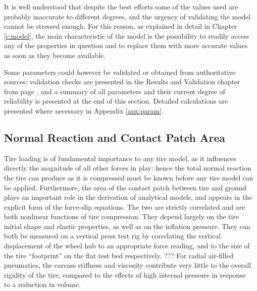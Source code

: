 \documentclass[12pt,a4paper]{report}
\newcommand{\virgolette}[1]{
\textquotedblleft #1\textquotedblright
}
\begin{document}
It is well understood that despite the best efforts some of the values used are probably inaccurate to different degrees, and the urgency of validating the model cannot be stressed enough.
For this reason, as explained in detail in Chapter \ref{c:model}, the main characteristic of the model is the possibility to readily access any of the properties in question and to replace them with more accurate values as soon as they become available.

Some parameters could however be validated or obtained from authoritative sources: validation checks are presented in the Results and Validation chapter from page \pageref{c:rev}, and a summary of all parameters and their current degree of reliability is presented at the end of this section.
Detailed calculations are presented where necessary in Appendix \ref{apx:param}.

\subsection{Normal Reaction and Contact Patch Area} \label{ssec:normrxn}
Tire loading is of fundamental importance to any tire model, as it influences directly the magnitude of all other forces in play: hence the total normal reaction the tire can produce as it is compressed must be known before any tire model can be applied.
Furthermore, the area of the contact patch between tire and ground plays an important role in the derivation of analytical models, and appears in the explicit form of the force-slip equations.
The two are strictly correlated and are both nonlinear functions of tire compression. They depend largely on the tire initial shape and elastic properties, as well as on the inflation pressure.
They can both be measured on a vertical press test rig by correlating the vertical displacement of the wheel hub to an appropriate force reading, and to the size of the tire \virgolette{footprint} on the flat test bed respectively. ??? 
For radial air-filled pneumatics, the carcass stiffness and viscosity contribute very little to the overall rigidity of the tire, compared to the effects of high internal pressure in response to a reduction in volume.
\end{document}
